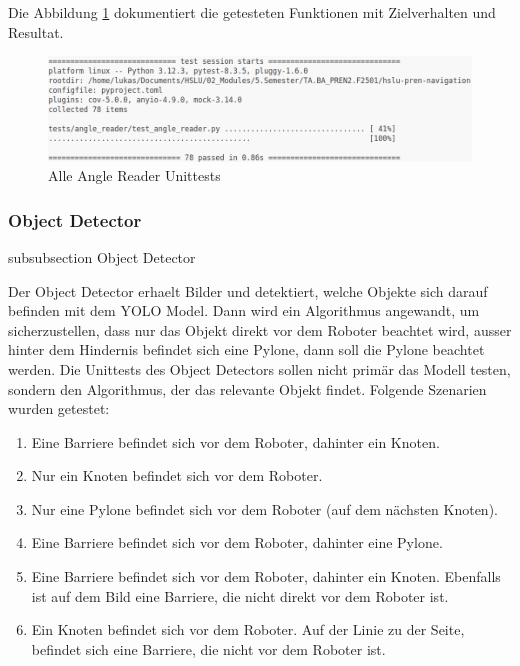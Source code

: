 Die Abbildung \ref{fig:angle-reader-unittests} dokumentiert die getesteten Funktionen mit Zielverhalten und Resultat.

\begin{figure}[H]
\centering
\includegraphics[width=\textwidth]{assets/IT/testing/unittests/angle_reader_unittests_result.png}
\caption{Alle Angle Reader Unittests}
\label{fig:angle-reader-unittests}
\end{figure}



\newpage
\subsubsection*{Object Detector}\label{object-detector-unittests}
{subsubsection}
{Object Detector}

Der Object Detector erhaelt Bilder und detektiert, welche Objekte sich darauf befinden mit dem YOLO Model. Dann wird ein Algorithmus angewandt, um sicherzustellen, dass nur das Objekt direkt vor dem Roboter beachtet wird, ausser hinter dem Hindernis befindet sich eine Pylone, dann soll die Pylone beachtet werden.
Die Unittests des Object Detectors sollen nicht primär das Modell testen, sondern den Algorithmus, der das relevante Objekt findet. Folgende Szenarien wurden getestet:

\begin{enumerate}
    \item Eine Barriere befindet sich vor dem Roboter, dahinter ein Knoten.
    \item Nur ein Knoten befindet sich vor dem Roboter.
    \item Nur eine Pylone befindet sich vor dem Roboter (auf dem nächsten Knoten).
    \item Eine Barriere befindet sich vor dem Roboter, dahinter eine Pylone.
    \item Eine Barriere befindet sich vor dem Roboter, dahinter ein Knoten. Ebenfalls ist auf dem Bild eine Barriere, die nicht direkt vor dem Roboter ist.
    \item Ein Knoten befindet sich vor dem Roboter. Auf der Linie zu der Seite, befindet sich eine Barriere, die nicht vor dem Roboter ist.
\end{enumerate}

